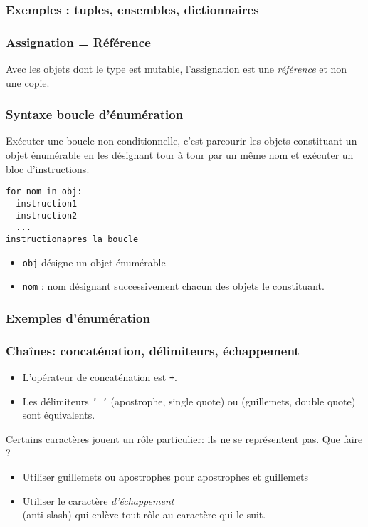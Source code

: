 \begin{frame}
  \frametitle{Exemples : tuples, ensembles, dictionnaires}
    
\end{frame}

\begin{frame}
  \frametitle{Assignation = Référence}
Avec les objets dont le type est mutable, l'assignation est une \emph{référence} et non une copie.

\end{frame}

\begin{frame}[fragile]
  \frametitle{Syntaxe boucle d'énumération}
Exécuter une boucle non conditionnelle, c'est parcourir les objets constituant un objet énumérable en les désignant tour à tour par un même nom et exécuter un bloc d'instructions. 
\begin{verbatim}
for nom in obj:
  instruction1
  instruction2
  ...
instructionapres la boucle\end{verbatim}
\begin{itemize}
  \item \texttt{obj} désigne un objet énumérable
  \item \texttt{nom} : nom désignant successivement chacun des objets le constituant. 
\end{itemize}
\end{frame}

\begin{frame}
  \frametitle{Exemples d'énumération}

\end{frame}

\begin{frame}
  \frametitle{Chaînes: concaténation, délimiteurs, échappement}
\begin{itemize}
  \item L'opérateur de concaténation est \texttt{+}.
  \item Les délimiteurs \texttt{' '} (apostrophe, single quote) ou  (guillemets, double quote) sont équivalents.
\end{itemize}
Certains caractères jouent un rôle particulier: \og ils ne se représentent pas\fg. Que faire ?
\begin{itemize}
  \item Utiliser guillemets ou apostrophes pour apostrophes et guillemets
  \item Utiliser le caractère \emph{d'échappement} \\ (anti-slash) qui enlève tout rôle au caractère qui le suit.
\end{itemize}
\end{frame}

